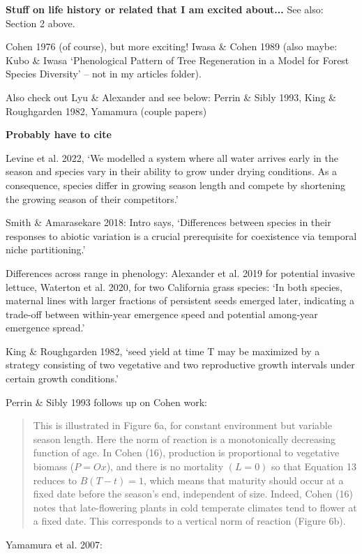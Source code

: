 \documentclass[11pt]{article}
\begin{document}
{\bf Stuff on life history or related that I am excited about...} See also: Section 2 above. 

Cohen 1976 (of course), but more exciting! Iwasa \& Cohen 1989 (also maybe: Kubo \& Iwasa `Phenological Pattern of Tree Regeneration in a Model for Forest Species Diversity' -- not in my articles folder). 

Also check out Lyu \& Alexander and see below: Perrin \& Sibly 1993, King \& Roughgarden 1982, Yamamura (couple papers)

{\bf Probably have to cite}

Levine et al. 2022, `We modelled a system where all water arrives early in the season and species vary in their ability to grow under drying conditions. As a consequence, species differ in growing season length and compete by shortening the growing season of their competitors.'

Smith \& Amarasekare 2018: Intro says, `Differences between species in their responses to abiotic variation is a crucial prerequisite for coexistence via temporal niche partitioning.' 

Differences across range in phenology: Alexander et al. 2019 for potential invasive lettuce, Waterton et al. 2020, for two California grass species: `In both species, maternal lines with larger fractions of persistent seeds emerged later, indicating a trade-off between within-year emergence speed and potential among-year emergence spread.'

King \& Roughgarden 1982, `seed yield at time T may be maximized by a strategy consisting of two vegetative and two reproductive growth intervals under certain growth conditions.'

Perrin \& Sibly 1993 follows up on Cohen work:
\begin{quote}
This is illustrated in Figure 6a, for constant environment but variable season length. Here the norm of reaction is a monotonically decreasing function of age. In Cohen (16), production is proportional to vegetative biomass ($P = Ox$), and there is no mortality $(L = 0)$ so that Equation 13 reduces to $B(T - t) = 1$, which means that maturity
should occur at a fixed date before the season's end, independent of size. Indeed, Cohen (16) notes that late-flowering plants in cold temperate climates tend to flower at a fixed date. This corresponds to a vertical norm of reaction (Figure 6b).
\end{quote}

Yamamura et al. 2007: 
\end{document}
